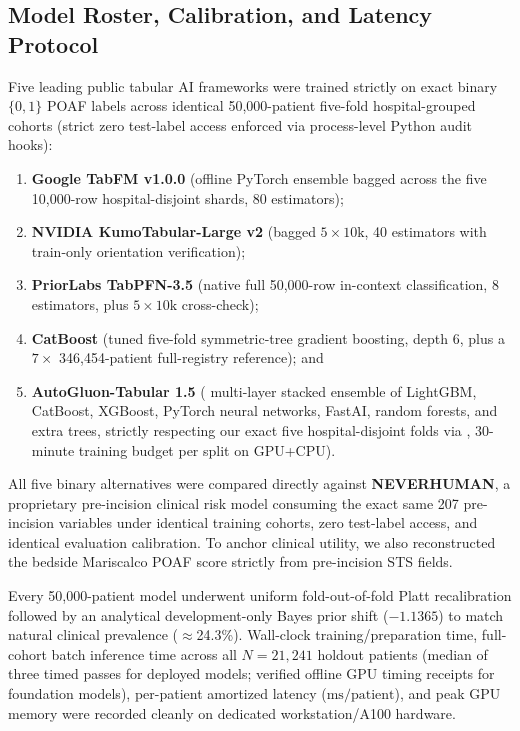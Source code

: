 \subsection{Model Roster, Calibration, and Latency Protocol}
Five leading public tabular AI frameworks were trained strictly on exact binary $\{0,1\}$ POAF labels across identical 50,000-patient five-fold hospital-grouped cohorts (strict zero test-label access enforced via process-level Python audit hooks):
\begin{enumerate}
  \item \textbf{Google TabFM v1.0.0}\cite{kong2026tabfm} (offline PyTorch ensemble bagged across the five 10,000-row hospital-disjoint shards, 80 estimators);
  \item \textbf{NVIDIA KumoTabular-Large v2}\cite{qu2026kumotabular} (bagged $5\times 10\text{k}$, 40 estimators with train-only orientation verification);
  \item \textbf{PriorLabs TabPFN-3.5}\cite{hollmann2025tabpfn,jaeger2026tabpfn35} (native full 50,000-row in-context classification, 8 estimators, plus $5\times 10\text{k}$ cross-check);
  \item \textbf{CatBoost}\cite{prokhorenkova2018catboost} (tuned five-fold symmetric-tree gradient boosting, depth 6, plus a $7\times$ 346,454-patient full-registry reference); and
  \item \textbf{AutoGluon-Tabular 1.5}\cite{erickson2020autogluon} ( multi-layer stacked ensemble of LightGBM, CatBoost, XGBoost, PyTorch neural networks, FastAI, random forests, and extra trees, strictly respecting our exact five hospital-disjoint folds via , 30-minute training budget per split on GPU+CPU).
\end{enumerate}
All five binary alternatives were compared directly against \textbf{NEVERHUMAN}, a proprietary pre-incision clinical risk model consuming the exact same 207 pre-incision variables under identical training cohorts, zero test-label access, and identical evaluation calibration. To anchor clinical utility, we also reconstructed the bedside Mariscalco POAF score strictly from pre-incision STS fields.\cite{mariscalco2014poaf}

Every 50,000-patient model underwent uniform fold-out-of-fold Platt recalibration\cite{platt1999probabilistic} followed by an analytical development-only Bayes prior shift ($-1.1365$) to match natural clinical prevalence ($\approx$24.3\%).\cite{king2001logistic,saerens2002adjusting} Wall-clock training/preparation time, full-cohort batch inference time across all $N{=}21{,}241$ holdout patients (median of three timed passes for deployed models; verified offline GPU timing receipts for foundation models), per-patient amortized latency ($\mathrm{ms/patient}$), and peak GPU memory were recorded cleanly on dedicated workstation/A100 hardware.

